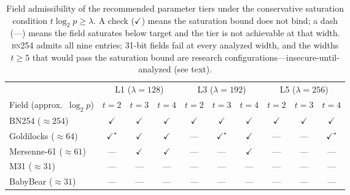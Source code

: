 \documentclass[11pt,a4paper]{article}
\theoremstyle{definition}
\begin{document}
\begin{table}[!htbp]
\centering
\caption{Field admissibility of the recommended parameter tiers under
the conservative saturation condition $t\log_2 p \ge \lambda$. A
check ($\checkmark$) means the saturation bound does not bind; a dash
(---) means the field saturates below target and the tier is not
achievable at that width. \textsc{bn254} admits all nine entries;
31-bit fields fail at every analyzed width, and the widths $t \ge 5$
that would pass the saturation bound are research
configurations---insecure-until-analyzed (see text).}
\label{tab:field-applicability}
\begin{tabular}{@{}lccc ccc ccc@{}}
\toprule
& \multicolumn{3}{c}{L1 ($\lambda=128$)}
& \multicolumn{3}{c}{L3 ($\lambda=192$)}
& \multicolumn{3}{c}{L5 ($\lambda=256$)} \\
\cmidrule(lr){2-4}\cmidrule(lr){5-7}\cmidrule(lr){8-10}
Field (approx.\ $\log_2 p$) & $t{=}2$ & $t{=}3$ & $t{=}4$
                            & $t{=}2$ & $t{=}3$ & $t{=}4$
                            & $t{=}2$ & $t{=}3$ & $t{=}4$ \\
\midrule
BN254 ($\approx 254$)       & $\checkmark$ & $\checkmark$ & $\checkmark$
                            & $\checkmark$ & $\checkmark$ & $\checkmark$
                            & $\checkmark$ & $\checkmark$ & $\checkmark$ \\
Goldilocks ($\approx 64$)   & $\checkmark^\star$ & $\checkmark$ & $\checkmark$
                            & ---          & $\checkmark^\star$ & $\checkmark$
                            & ---          & ---          & $\checkmark^\star$ \\
Mersenne-61 ($\approx 61$)  & ---          & $\checkmark$ & $\checkmark$
                            & ---          & ---          & $\checkmark$
                            & ---          & ---          & --- \\
M31 ($\approx 31$)          & ---          & ---          & ---
                            & ---          & ---          & ---
                            & ---          & ---          & --- \\
BabyBear ($\approx 31$)     & ---          & ---          & ---
                            & ---          & ---          & ---
                            & ---          & ---          & --- \\
\bottomrule
\end{tabular}
\smallskip


\end{table}
\end{document}
